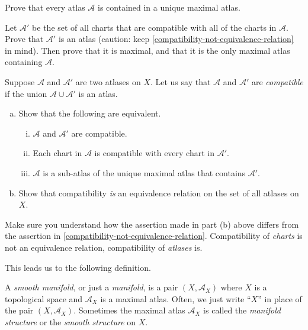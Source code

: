 \begin{exercise} \label{existence-maximal-atlas}
	Prove that every atlas $\mathscr{A}$ is contained in a unique maximal atlas. 
	\begin{hint}
		Let $\mathscr{A}'$ be the set of all charts that are compatible with all of the charts in $\mathscr{A}$. Prove that $\mathscr{A}'$ is an atlas (caution: keep \cref{compatibility-not-equivalence-relation} in mind). Then prove that it is maximal, and that it is the only maximal atlas containing $\mathscr{A}$. 
	\end{hint}
\end{exercise}

\begin{exercise}
	Suppose $\mathscr{A}$ and $\mathscr{A}'$ are two atlases on $X$. Let us say that $\mathscr{A}$ and $\mathscr{A}'$ are \emph{compatible} if the union $\mathscr{A} \cup \mathscr{A}'$ is an atlas. 
	\begin{enumerate}[(a)]
		\item  Show that the following are equivalent. 
		\begin{enumerate}[(i)]
			\item $\mathscr{A}$ and $\mathscr{A}'$ are compatible. 
			\item Each chart in $\mathscr{A}$ is compatible with every chart in $\mathscr{A}'$. 
			\item $\mathscr{A}$ is a sub-atlas of the unique maximal atlas that contains $\mathscr{A}'$. 
		\end{enumerate}
		\item Show that compatibility \emph{is} an equivalence relation on the set of all atlases on $X$.
	\end{enumerate} 
	Make sure you understand how the assertion made in part (b) above differs from the assertion in \cref{compatibility-not-equivalence-relation}. Compatibility of  \emph{charts} is not an equivalence relation, compatibility of \emph{atlases} is. 
\end{exercise}

This leads us to the following definition.

\begin{definition}[Manifold]  
	A \emph{smooth manifold}, or just a \emph{manifold}, is a pair $(X, \mathscr{A}_X)$ where $X$ is a topological space and $\mathscr{A}_X$ is a maximal atlas. Often, we just write ``$X$'' in place of the pair $(X, \mathscr{A}_X)$. Sometimes the maximal atlas $\mathscr{A}_X$ is called the \emph{manifold structure} or the \emph{smooth structure} on $X$.
\end{definition}

